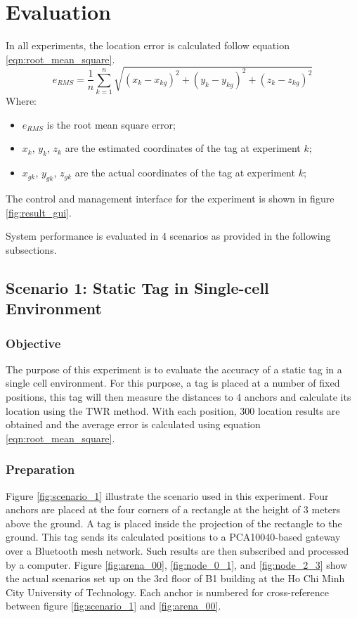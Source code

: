 \documentclass[\main/thesis.tex]{subfiles}
\begin{document}
\section{Evaluation}

In all experiments, the location error is calculated follow equation \ref{eqn:root_mean_square}.
\begin{equation}
    e_{RMS} = \frac{1}{n} \sum_{k=1}^{n} \sqrt{(x_k-x_{kg})^2 + (y_k-y_{kg})^2 + (z_k-z_{kg})^2}
    \label{eqn:root_mean_square}
\end{equation}
Where:
\begin{itemize}
    \item $e_{RMS}$ is the root mean square error;
    \item $x_k$, $y_k$, $z_k$ are the estimated coordinates of the tag at experiment $k$;
    \item $x_{gk}$, $y_{gk}$, $z_{gk}$ are the actual coordinates of the tag at experiment $k$;
\end{itemize}
The control and management interface for the experiment is shown in figure \ref{fig:result_gui}.

System performance is evaluated in 4 scenarios as provided in the following subsections.
\subsection{Scenario 1: Static Tag in Single-cell Environment}
\label{subsection:scenario_1}
\subsubsection{Objective}
The purpose of this experiment is to evaluate the accuracy of a static tag in a single cell environment.
For this purpose, a tag is placed at a number of fixed positions, this tag will then measure the distances to 4 anchors and calculate its location using the TWR method. With each position, 300 location results are obtained and the average error is calculated using equation \ref{eqn:root_mean_square}.
\subsubsection{Preparation}
Figure \ref{fig:scenario_1} illustrate the scenario used in this experiment. Four anchors are placed at the four corners of a rectangle at the height of 3 meters above the ground. A tag is placed inside the projection of the rectangle to the ground. This tag sends its calculated positions to a PCA10040-based gateway over a Bluetooth mesh network. Such results are then subscribed and processed by a computer. Figure \ref{fig:arena_00}, \ref{fig:node_0_1}, and \ref{fig:node_2_3} show the actual scenarios set up on the 3rd floor of B1 building at the Ho Chi Minh City University of Technology. Each anchor is numbered for cross-reference between figure \ref{fig:scenario_1} and \ref{fig:arena_00}.
\end{document}
